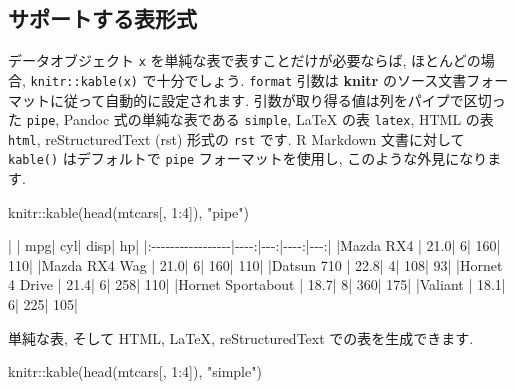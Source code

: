 \documentclass[
  11pt,
  lualatex,ja=standard,jafont=noto]{bxjsreport}
\newenvironment{Shaded}{\begin{snugshade}}{\end{snugshade}}
\newcommand{\DecValTok}[1]{\textcolor[rgb]{0.00,0.00,0.81}{#1}}
\newcommand{\FunctionTok}[1]{\textcolor[rgb]{0.00,0.00,0.00}{#1}}
\newcommand{\NormalTok}[1]{#1}
\newcommand{\SpecialCharTok}[1]{\textcolor[rgb]{0.00,0.00,0.00}{#1}}
\newcommand{\StringTok}[1]{\textcolor[rgb]{0.31,0.60,0.02}{#1}}
\begin{document}
\hypertarget{kable-formats}{%
\subsection{サポートする表形式}\label{kable-formats}}

データオブジェクト \texttt{x} を単純な表で表すことだけが必要ならば, ほとんどの場合, \texttt{knitr::kable(x)} で十分でしょう. \texttt{format} 引数は \textbf{knitr} のソース文書フォーマットに従って自動的に設定されます. 引数が取り得る値は列をパイプで区切った \texttt{pipe}, Pandoc 式の単純な表である \texttt{simple}, LaTeX の表 \texttt{latex}, HTML の表 \texttt{html}, reStructuredText (rst) 形式の \texttt{rst} です. R Markdown 文書に対して \texttt{kable()} はデフォルトで \texttt{pipe} フォーマットを使用し, このような外見になります.

\begin{Shaded}
\begin{Highlighting}[numbers=left,,]
\NormalTok{knitr}\SpecialCharTok{::}\FunctionTok{kable}\NormalTok{(}\FunctionTok{head}\NormalTok{(mtcars[, }\DecValTok{1}\SpecialCharTok{:}\DecValTok{4}\NormalTok{]), }\StringTok{"pipe"}\NormalTok{)}
\end{Highlighting}
\end{Shaded}

\begin{Shaded}
\begin{Highlighting}[]
\NormalTok{|                  |  mpg| cyl| disp|  hp|}
\NormalTok{|:{-}{-}{-}{-}{-}{-}{-}{-}{-}{-}{-}{-}{-}{-}{-}{-}{-}|{-}{-}{-}{-}:|{-}{-}{-}:|{-}{-}{-}{-}:|{-}{-}{-}:|}
\NormalTok{|Mazda RX4         | 21.0|   6|  160| 110|}
\NormalTok{|Mazda RX4 Wag     | 21.0|   6|  160| 110|}
\NormalTok{|Datsun 710        | 22.8|   4|  108|  93|}
\NormalTok{|Hornet 4 Drive    | 21.4|   6|  258| 110|}
\NormalTok{|Hornet Sportabout | 18.7|   8|  360| 175|}
\NormalTok{|Valiant           | 18.1|   6|  225| 105|}
\end{Highlighting}
\end{Shaded}

単純な表, そして HTML, LaTeX, reStructuredText での表を生成できます.

\begin{Shaded}
\begin{Highlighting}[numbers=left,,]
\NormalTok{knitr}\SpecialCharTok{::}\FunctionTok{kable}\NormalTok{(}\FunctionTok{head}\NormalTok{(mtcars[, }\DecValTok{1}\SpecialCharTok{:}\DecValTok{4}\NormalTok{]), }\StringTok{"simple"}\NormalTok{)}
\end{Highlighting}
\end{Shaded}
\end{document}
